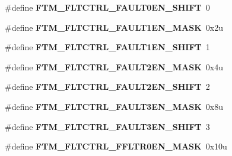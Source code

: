 \begin{DoxyCompactItemize}
\item 
\#define {\bfseries F\+T\+M\+\_\+\+F\+L\+T\+C\+T\+R\+L\+\_\+\+F\+A\+U\+L\+T0\+E\+N\+\_\+\+S\+H\+I\+FT}~0\hypertarget{group__FTM__Register__Masks_gafa7b6c89e0fe43e698c029defe0c227e}{}\label{group__FTM__Register__Masks_gafa7b6c89e0fe43e698c029defe0c227e}

\item 
\#define {\bfseries F\+T\+M\+\_\+\+F\+L\+T\+C\+T\+R\+L\+\_\+\+F\+A\+U\+L\+T1\+E\+N\+\_\+\+M\+A\+SK}~0x2u\hypertarget{group__FTM__Register__Masks_gad7d98277395370cf8e028048aa97d3c3}{}\label{group__FTM__Register__Masks_gad7d98277395370cf8e028048aa97d3c3}

\item 
\#define {\bfseries F\+T\+M\+\_\+\+F\+L\+T\+C\+T\+R\+L\+\_\+\+F\+A\+U\+L\+T1\+E\+N\+\_\+\+S\+H\+I\+FT}~1\hypertarget{group__FTM__Register__Masks_ga35e4d4e03c8a8bc735f9a816f85665e6}{}\label{group__FTM__Register__Masks_ga35e4d4e03c8a8bc735f9a816f85665e6}

\item 
\#define {\bfseries F\+T\+M\+\_\+\+F\+L\+T\+C\+T\+R\+L\+\_\+\+F\+A\+U\+L\+T2\+E\+N\+\_\+\+M\+A\+SK}~0x4u\hypertarget{group__FTM__Register__Masks_ga1e35c0281db74fb68969c15377596ea5}{}\label{group__FTM__Register__Masks_ga1e35c0281db74fb68969c15377596ea5}

\item 
\#define {\bfseries F\+T\+M\+\_\+\+F\+L\+T\+C\+T\+R\+L\+\_\+\+F\+A\+U\+L\+T2\+E\+N\+\_\+\+S\+H\+I\+FT}~2\hypertarget{group__FTM__Register__Masks_gaf41dd0966742f642b633ce812a13bfc7}{}\label{group__FTM__Register__Masks_gaf41dd0966742f642b633ce812a13bfc7}

\item 
\#define {\bfseries F\+T\+M\+\_\+\+F\+L\+T\+C\+T\+R\+L\+\_\+\+F\+A\+U\+L\+T3\+E\+N\+\_\+\+M\+A\+SK}~0x8u\hypertarget{group__FTM__Register__Masks_ga5b3b4ac103a4459ae5ef09d3d83a2352}{}\label{group__FTM__Register__Masks_ga5b3b4ac103a4459ae5ef09d3d83a2352}

\item 
\#define {\bfseries F\+T\+M\+\_\+\+F\+L\+T\+C\+T\+R\+L\+\_\+\+F\+A\+U\+L\+T3\+E\+N\+\_\+\+S\+H\+I\+FT}~3\hypertarget{group__FTM__Register__Masks_ga19ffec80742795f21edc0cb15a74cff6}{}\label{group__FTM__Register__Masks_ga19ffec80742795f21edc0cb15a74cff6}

\item 
\#define {\bfseries F\+T\+M\+\_\+\+F\+L\+T\+C\+T\+R\+L\+\_\+\+F\+F\+L\+T\+R0\+E\+N\+\_\+\+M\+A\+SK}~0x10u\hypertarget{group__FTM__Register__Masks_ga08d69ad3bf701debb5a53bfadbc7031d}{}\label{group__FTM__Register__Masks_ga08d69ad3bf701debb5a53bfadbc7031d}


\end{DoxyCompactItemize}
